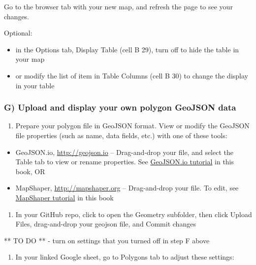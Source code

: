 \documentclass[
  english,
]{book}
\providecommand{\tightlist}{%
  \setlength{\itemsep}{0pt}\setlength{\parskip}{0pt}}
\begin{document}
Go to the browser tab with your new map, and refresh the page to see your changes.

Optional:

\begin{itemize}
\tightlist
\item
  in the Options tab, Display Table (cell B 29), turn off to hide the table in your map
\item
  or modify the list of item in Table Columns (cell B 30) to change the display in your table
\end{itemize}

\hypertarget{g-upload-and-display-your-own-polygon-geojson-data}{%
\subsubsection*{G) Upload and display your own polygon GeoJSON data}\label{g-upload-and-display-your-own-polygon-geojson-data}}

\begin{enumerate}
\def\labelenumi{\arabic{enumi})}
\tightlist
\item
  Prepare your polygon file in GeoJSON format. View or modify the GeoJSON file properties (such as name, data fields, etc.) with one of these tools:
\end{enumerate}

\begin{itemize}
\tightlist
\item
  GeoJSON.io, \url{http://geojson.io} -- Drag-and-drop your file, and select the Table tab to view or rename properties. See \href{geojsonio}{GeoJSON.io tutorial} in this book, OR
\item
  MapShaper, \url{http://mapshaper.org} -- Drag-and-drop your file. To edit, see \href{mapshaper}{MapShaper tutorial} in this book
\end{itemize}

\begin{enumerate}
\def\labelenumi{\arabic{enumi})}
\setcounter{enumi}{1}
\tightlist
\item
  In your GitHub repo, click to open the Geometry subfolder, then click Upload Files, drag-and-drop your geojson file, and Commit changes
\end{enumerate}

** TO DO ** - turn on settings that you turned off in step F above

\begin{enumerate}
\def\labelenumi{\arabic{enumi})}
\setcounter{enumi}{2}
\tightlist
\item
  In your linked Google sheet, go to Polygons tab to adjust these settings:
\end{enumerate}
\end{document}
